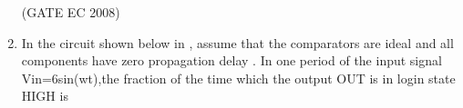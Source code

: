 \begin{enumerate}[label=\arabic*.,ref=\theenumi]
\begin{enumerate}
\end{enumerate}
\hfill(GATE EC 2008)
    \begin{figure}[H]
\centering
{}
        \caption{}
        \label{fig:GATE EC 2008}
    \end{figure}
\iffalse
    \item 
        \label{prob:gate EC 9}
	 In the circuit shown below in , assume that the comparators are ideal and all components have zero propagation delay . In one period of the input signal Vin=6sin(wt),the fraction of the time which the output OUT is in login state HIGH is 


\end{enumerate}
